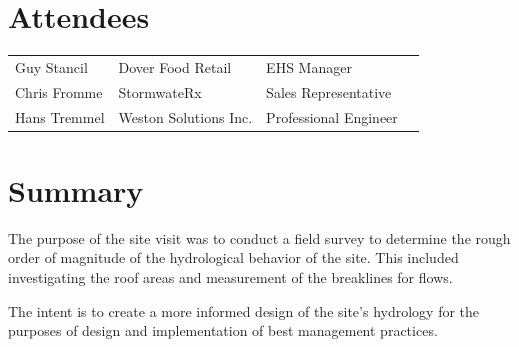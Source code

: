 \documentclass{article}
\begin{document}
\section*{Attendees}
\begin{table}[h]
  \label{tab:label}
  \begin{tabular}{l l l l}
      Guy Stancil & Dover Food Retail & EHS Manager \\
      Chris Fromme & StormwateRx & Sales Representative \\
      Hans Tremmel & Weston Solutions Inc. & Professional Engineer \\
  \end{tabular}
\end{table}

\section*{Summary}

The purpose of the site visit was to conduct a field survey to determine the
rough order of magnitude of the hydrological behavior of the site.  This
included investigating the roof areas and measurement of the breaklines for
flows.

The intent is to create a more informed design of the site's hydrology for the
purposes of design and implementation of best management practices.

\newpage


\end{document}
